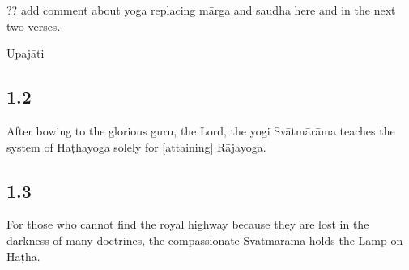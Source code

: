 \begin{ekdosis}
\begin{philcomm}[hp01_001]
?? add comment about yoga replacing mārga and saudha here and in the next two verses.





\end{philcomm}

\begin{metre}[hp01_001]
Upajāti
\end{metre}
\subsection*{1.2}
\begin{translation}[hp01_002]
After bowing to the glorious guru, the Lord, the yogi Svātmārāma teaches the system of Haṭhayoga solely for [attaining] Rājayoga.
\end{translation}

\begin{philcomm}[hp01_002]
\end{philcomm}

\subsection*{1.3}
\begin{translation}[hp01_003]
 For those who cannot find the royal highway because they are lost in the darkness of many doctrines, the compassionate Svātmārāma holds the Lamp on Haṭha.
\end{translation}


\end{ekdosis}
